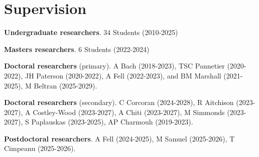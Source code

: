 \documentclass[letterpaper]{article}
\renewenvironment{itemize}{
  \begin{list}{}{
    \setlength{\leftmargin}{1.5em}
  }
}{
  \end{list}
}
\begin{document}
\section*{Supervision}
\begin{itemize}
\item {\bf Undergraduate researchers}. 34 Students (2010-2025) %
\item {\bf Masters researchers}. 6 Students (2022-2024)
\item {\bf Doctoral researchers} (primary). A Bach (2018-2023), TSC Pannetier (2020-2022), JH Paterson (2020-2022), A Fell (2022-2023), and BM Marshall (2021-2025), M Beltran (2025-2029).
\item {\bf Doctoral researchers} (secondary). C Corcoran (2024-2028), R Aitchison (2023-2027), A Costley-Wood (2023-2027), A Chiti (2023-2027), M Simmonds (2023-2027), S Paplauskas (2023-2025), AP Charmouh (2019-2023).
\item {\bf Postdoctoral researchers}. A Fell (2024-2025), M Samuel (2025-2026), T Cimpeanu (2025-2026).
\end{itemize}
\end{document}

